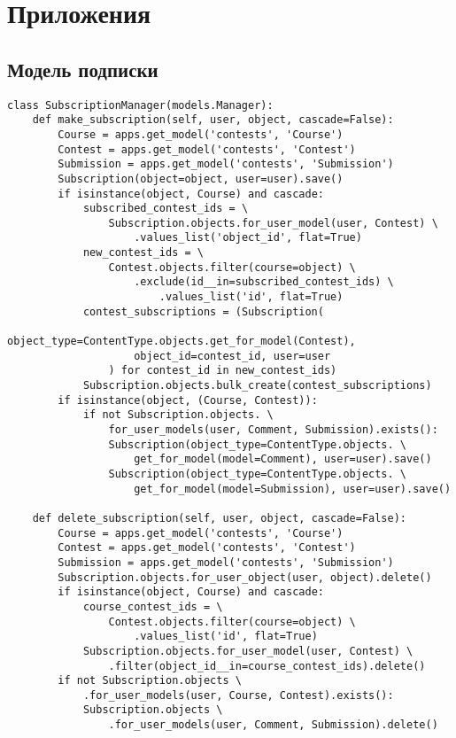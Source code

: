 \documentclass[12pt, a4paper, oneside]{article}
\begin{document}
\section{Приложения}
\subsection{Модель подписки}
\begin{verbatim}
class SubscriptionManager(models.Manager):
    def make_subscription(self, user, object, cascade=False):
        Course = apps.get_model('contests', 'Course')
        Contest = apps.get_model('contests', 'Contest')
        Submission = apps.get_model('contests', 'Submission')
        Subscription(object=object, user=user).save()
        if isinstance(object, Course) and cascade:
            subscribed_contest_ids = \
                Subscription.objects.for_user_model(user, Contest) \
                    .values_list('object_id', flat=True)
            new_contest_ids = \
                Contest.objects.filter(course=object) \
                    .exclude(id__in=subscribed_contest_ids) \
                        .values_list('id', flat=True)
            contest_subscriptions = (Subscription(
                    object_type=ContentType.objects.get_for_model(Contest), 
                    object_id=contest_id, user=user
                ) for contest_id in new_contest_ids)
            Subscription.objects.bulk_create(contest_subscriptions)
        if isinstance(object, (Course, Contest)):
            if not Subscription.objects. \
                for_user_models(user, Comment, Submission).exists():
                Subscription(object_type=ContentType.objects. \
                    get_for_model(model=Comment), user=user).save()
                Subscription(object_type=ContentType.objects. \
                    get_for_model(model=Submission), user=user).save()
    
    def delete_subscription(self, user, object, cascade=False):
        Course = apps.get_model('contests', 'Course')
        Contest = apps.get_model('contests', 'Contest')
        Submission = apps.get_model('contests', 'Submission')
        Subscription.objects.for_user_object(user, object).delete()
        if isinstance(object, Course) and cascade:
            course_contest_ids = \
                Contest.objects.filter(course=object) \
                    .values_list('id', flat=True)
            Subscription.objects.for_user_model(user, Contest) \
                .filter(object_id__in=course_contest_ids).delete()
        if not Subscription.objects \
            .for_user_models(user, Course, Contest).exists():
            Subscription.objects \
                .for_user_models(user, Comment, Submission).delete()


\end{verbatim}
\end{document}
